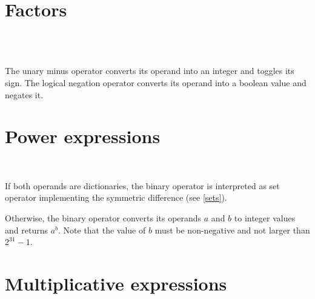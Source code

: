 \section{Factors}

\begin{grammar}
      \produces {} \\
      \produces \lextoken{$-$}  \\
      \produces \lextoken{!} 
\end{grammar}

\noindent
The unary minus operator \token{$-$} converts its operand into an integer
and toggles its sign. The logical negation operator \token{!} converts
its operand into a boolean value and negates it.

\section{Power expressions}

\begin{grammar}
      \produces {} \\
      \produces {}
         \lextoken{\caretSY} 
\end{grammar}

\noindent
If both operands are dictionaries, the binary operator \token{\caretSY}
is interpreted as set operator implementing the symmetric difference
(see \ref{sets}).

Otherwise, the binary operator \token{\caretSY} converts its operands
$a$ and $b$ to integer values and returns $a^b$. Note that
the value of $b$ must be non-negative and not larger than $2^{31}-1$.

\section{Multiplicative expressions}

\begin{grammar}
      \produces {} \\
      \produces {}
         \lextoken{$*$}  \\
      \produces {}
           \\
      \produces {}
          
\end{grammar}

